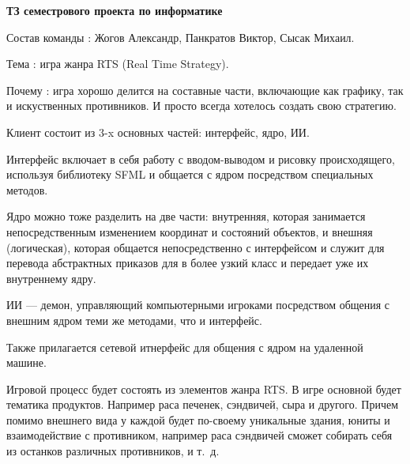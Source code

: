 \documentclass[a4paper]{article}
\begin{document}
\begin{center}
\Large\textbf{ТЗ семестрового проекта по информатике}
\end{center}

Состав команды : Жогов Александр, Панкратов Виктор, Сысак Михаил.

Тема : игра жанра RTS (Real Time Strategy).

Почему : игра хорошо делится на составные части, включающие как графику, так и искуственных противников. И просто всегда хотелось создать свою стратегию.

Клиент состоит из $3$-x основных частей: интерфейс, ядро, ИИ.

Интерфейс включает в себя работу с вводом-выводом и рисовку происходящего, используя библиотеку SFML и общается с ядром посредством специальных методов.

Ядро можно тоже разделить на две части: внутренняя, которая занимается непосредственным изменением координат и состояний объектов, и внешняя (логическая), которая общается непосредственно с интерфейсом и служит для перевода абстрактных приказов для в более узкий класс и передает уже их внутреннему ядру.

ИИ --- демон, управляющий компьютерными игроками посредством общения с внешним ядром теми же методами, что и интерфейс.

Также прилагается сетевой итнерфейс для общения с ядром на удаленной машине.

Игровой процесс будет состоять из элементов жанра RTS. В игре основной будет тематика продуктов. Например раса печенек, сэндвичей, сыра и другого. Причем помимо внешнего вида у каждой будет по-своему уникальные здания, юниты и взаимодействие с противником, например раса сэндвичей сможет собирать себя из останков различных противников, и т.~д.
\end{document}
